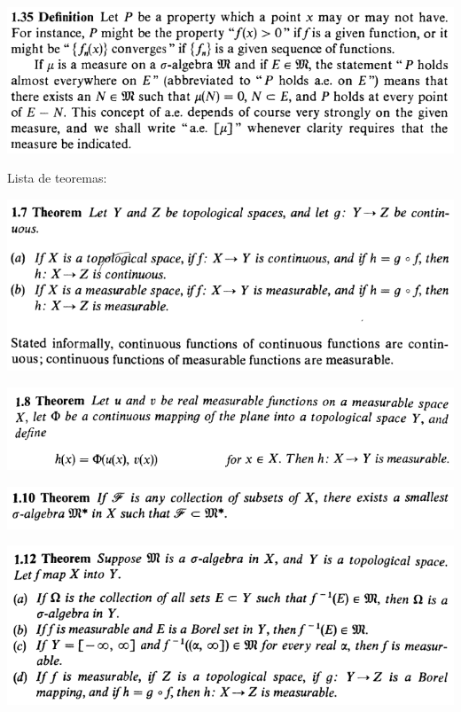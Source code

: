 \documentclass[12pt]{article}
\begin{document}
		\begin{center}
		\includegraphics{d1ponto35}
		\end{center}

Lista de teoremas:

		\begin{center}
		\includegraphics{1ponto7}
		\end{center}

		\begin{center}
		\includegraphics{1ponto8}
		\end{center}

		\begin{center}
		\includegraphics{1ponto10}
		\end{center}

		\begin{center}
		\includegraphics{1ponto12}
		\end{center}
\end{document}
